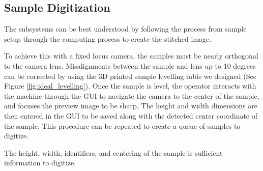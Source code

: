 \documentclass[a4paper,12pt]{article}
\begin{document}
\subsection{Sample Digitization} %
The subsystems can be best understood by following the process from sample setup through the computing process to create the stitched image. 

To achieve this with a fixed focus camera, the samples must be nearly orthogonal to the camera lens. Misalignments between the sample and lens up to 10 degrees can be corrected by using the 3D printed sample levelling table we designed (See Figure \ref{fig:ideal_levelling}).
Once the sample is level, the operator interacts with the machine through the GUI to navigate the camera to the center of the sample, and focuses the preview image to be sharp. The height and width dimensions are then entered in the GUI
to be saved along with the detected center coordinate of the sample. This procedure can be repeated to create a queue of samples to digitize.

The height, width, identifiers, and centering of the sample is sufficient information to digitize.
\end{document}
